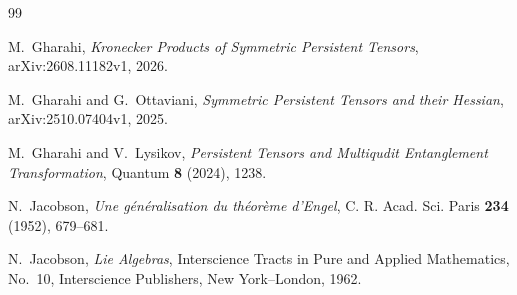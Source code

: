 \documentclass[11pt]{amsart}
\begin{document}
\begin{thebibliography}{99}

M.~Gharahi,
\emph{Kronecker Products of Symmetric Persistent Tensors},
arXiv:2608.11182v1, 2026.

M.~Gharahi and G.~Ottaviani,
\emph{Symmetric Persistent Tensors and their Hessian},
arXiv:2510.07404v1, 2025.

M.~Gharahi and V.~Lysikov,
\emph{Persistent Tensors and Multiqudit Entanglement Transformation},
Quantum \textbf{8} (2024), 1238.

N.~Jacobson,
\emph{Une g\'en\'eralisation du th\'eor\`eme d'Engel},
C. R. Acad. Sci. Paris \textbf{234} (1952), 679--681.

N.~Jacobson,
\emph{Lie Algebras},
Interscience Tracts in Pure and Applied Mathematics, No.~10,
Interscience Publishers, New York--London, 1962.

\end{thebibliography}
\end{document}
